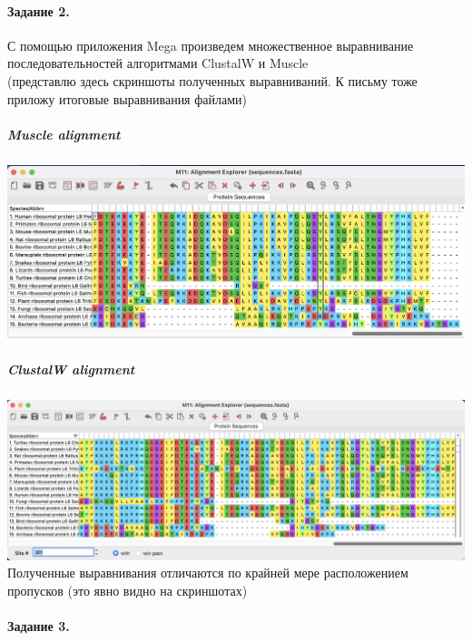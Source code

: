 \documentclass[12pt]{article}
\begin{document}
\paragraph{Задание 2.}
С помощью приложения Mega произведем множественное выравнивание последовательностей алгоритмами ClustalW и Muscle \\
(представлю здесь скриншоты полученных выравниваний. К письму тоже приложу итоговые выравнивания файлами)\\
\subparagraph{Muscle alignment\\}
\includegraphics[width=\textwidth]{images/image1.png}\\

\subparagraph{ClustalW alignment\\}
\includegraphics[width=\textwidth]{images/image2.png}\\

Полученные выравнивания отличаются по крайней мере расположением пропусков (это явно видно на скриншотах)

\newpage
\paragraph{Задание 3.}
\end{document}
